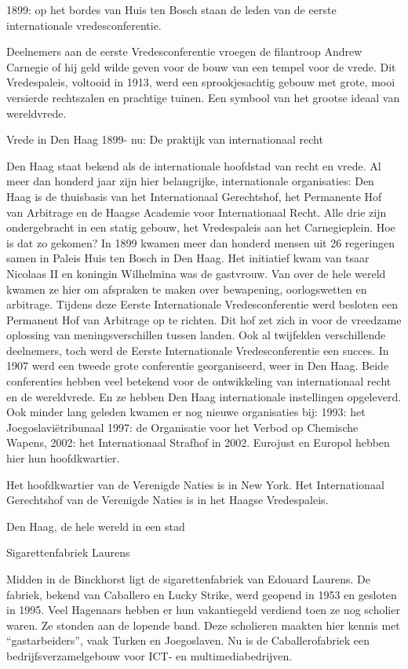\documentclass[
  a4paper,
]{book}
\begin{document}
1899: op het bordes van Huis ten Bosch staan de leden van de eerste internationale vredesconferentie.

Deelnemers aan de eerste Vredesconferentie vroegen de filantroop Andrew Carnegie of hij geld wilde geven voor de bouw van een tempel voor de vrede. Dit Vredespaleis, voltooid in 1913, werd een sprookjesachtig gebouw met grote, mooi versierde rechtszalen en prachtige tuinen. Een symbool van het grootse ideaal van wereldvrede.

Vrede in Den Haag
1899- nu: De praktijk van internationaal recht

Den Haag staat bekend als de internationale hoofdstad van recht en vrede.
Al meer dan honderd jaar zijn hier belangrijke, internationale organisaties:
Den Haag is de thuisbasis van het Internationaal Gerechtshof, het Permanente Hof van Arbitrage en de Haagse Academie voor Internationaal Recht.
Alle drie zijn ondergebracht in een statig gebouw, het Vredespaleis aan het Carnegieplein.
Hoe is dat zo gekomen?
In 1899 kwamen meer dan honderd mensen uit 26 regeringen samen in Paleis Huis ten Bosch in Den Haag.
Het initiatief kwam van tsaar Nicolaas II en koningin Wilhelmina was de gastvrouw.
Van over de hele wereld kwamen ze hier om afspraken te maken over bewapening, oorlogswetten en arbitrage.
Tijdens deze Eerste Internationale Vredesconferentie werd besloten een Permanent Hof van Arbitrage op te richten.
Dit hof zet zich in voor de vreedzame oplossing van meningsverschillen tussen landen.
Ook al twijfelden verschillende deelnemers, toch werd de Eerste Internationale Vredesconferentie een succes.
In 1907 werd een tweede grote conferentie georganiseerd, weer in Den Haag.
Beide conferenties hebben veel betekend voor de ontwikkeling van internationaal recht en de wereldvrede. En ze hebben Den Haag internationale instellingen opgeleverd.
Ook minder lang geleden kwamen er nog nieuwe organisaties bij:
1993: het Joegoslaviëtribunaal
1997: de Organisatie voor het Verbod op Chemische Wapens,
2002: het Internationaal Strafhof in 2002.
Eurojust en Europol hebben hier hun hoofdkwartier.

Het hoofdkwartier van de Verenigde Naties is in New York.
Het Internationaal Gerechtshof van de Verenigde Naties is in het Haagse Vredespaleis.

Den Haag, de hele wereld in een stad

Sigarettenfabriek Laurens

Midden in de Binckhorst ligt de sigarettenfabriek van Edouard Laurens. De fabriek, bekend van Caballero en Lucky Strike, werd geopend in 1953 en gesloten in 1995. Veel Hagenaars hebben er hun vakantiegeld verdiend toen ze nog scholier waren. Ze stonden aan de lopende band. Deze scholieren maakten hier kennis met ``gastarbeiders'', vaak Turken en Joegoslaven. Nu is de Caballerofabriek een bedrijfsverzamelgebouw voor ICT- en multimediabedrijven.
\end{document}
